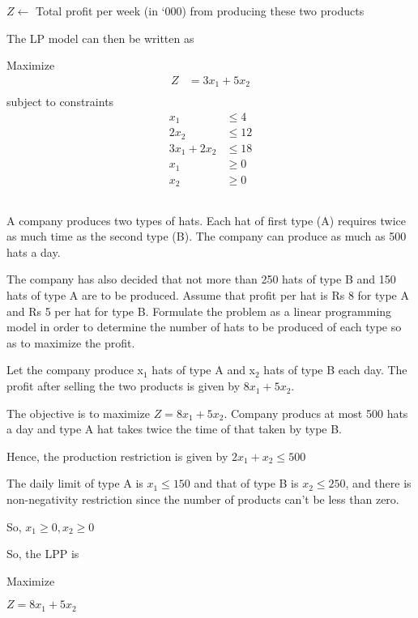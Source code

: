 \documentclass[12pt]{article}
\begin{document}
$Z \gets$ Total profit per week (in `000) from producing these two products 

The LP model can then be written as 

Maximize
\begin{align*}
Z            & = 3x_1 + 5x_2 \\
\end{align*}
subject to constraints
\begin{align*}
x_1          & \le 4         \\
2 x_2        & \le 12        \\
3x_1 + 2 x_2 & \le 18        \\
x_1          & \ge 0         \\
x_2          & \ge 0
\end{align*}
\subsection{}

A company produces two types of hats. Each hat of first type (A)  requires twice as much time as the second type (B). 
The company can produce as much as 500 hats a day. 

The company has also decided that not more than 250 hats of type B and 150 hats of type A are to be produced. 
Assume that profit per hat is Rs 8 for type A and Rs 5 per hat for type B. Formulate the problem as a linear programming model in order to determine the number of hats to be produced of each type so as to maximize the profit.

Let the company produce x$_1$ hats of type A and x$_2$ hats of type B each day. The profit after selling the two products is given by 
$8 x_1 + 5 x_2$.

The objective is to maximize $Z = 8 x_1 + 5 x_2$. Company producs at most 500 hats a day and type A hat takes twice the time of that taken by type B.

Hence, the production restriction is given by $2 x_1 +x_2 \le 500$

The daily limit of type A is $x_1\le 150$ and that of type B is $x_2\le 250$, and there is non-negativity restriction since the number of products can't be less than zero. 

So, $x_1\ge 0, x_2\ge 0$

So, the LPP is 

Maximize 
\begin{center}
$Z=8 x_1 + 5 x_2$
\end{center}
\end{document}
